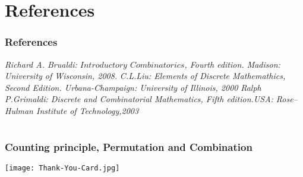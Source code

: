 \documentclass{beamer}
\begin{document}
\section{References}
\begin{frame}
 \frametitle{References}
 \begin{thebibliography}{5}
   \emph{  Richard A. Brualdi: $Introductory$ $Combinatorics$, Fourth edition. Madison: University of Wisconsin, 2008.}{\vspace{.6cm}}
     \emph{C.L.Liu: Elements of Discrete Mathemathics, Second Edition. Urbana-Champaign: University of Illinois, 2000 }{\vspace{.6cm}}
       \emph{Ralph P.Grimaldi: Discrete and Combinatorial Mathematics, Fifth edition.USA: Rose–Hulman Institute of Technology,2003}{\vspace{1cm}}
 \end{thebibliography}
 \end{frame}
 
\section{}
 \begin{frame}
\frametitle{ Counting principle, Permutation and Combination}
\texttt{[image: Thank-You-Card.jpg]}
\end{frame}
\end{document}
